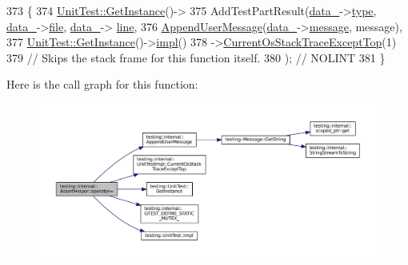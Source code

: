 \begin{DoxyCode}
373                                                          \{
374   \hyperlink{classtesting_1_1UnitTest_a24192400b70b3b946746954e9574fb8e}{UnitTest::GetInstance}()->
375     AddTestPartResult(\hyperlink{classtesting_1_1internal_1_1AssertHelper_af69a4d66a929d0c6e419f4efd3ba6b3a}{data\_}->\hyperlink{structtesting_1_1internal_1_1AssertHelper_1_1AssertHelperData_a7b1d1a77882cd82107acea856d45692f}{type}, \hyperlink{classtesting_1_1internal_1_1AssertHelper_af69a4d66a929d0c6e419f4efd3ba6b3a}{data\_}->\hyperlink{structtesting_1_1internal_1_1AssertHelper_1_1AssertHelperData_a639ae4acc706e919b101786f71e9dc15}{file}, \hyperlink{classtesting_1_1internal_1_1AssertHelper_af69a4d66a929d0c6e419f4efd3ba6b3a}{data\_}->
      \hyperlink{structtesting_1_1internal_1_1AssertHelper_1_1AssertHelperData_aff816673320ecd035288dffe44760f90}{line},
376                       \hyperlink{namespacetesting_1_1internal_ae475a090bca903bb222dd389eb189166}{AppendUserMessage}(\hyperlink{classtesting_1_1internal_1_1AssertHelper_af69a4d66a929d0c6e419f4efd3ba6b3a}{data\_}->\hyperlink{structtesting_1_1internal_1_1AssertHelper_1_1AssertHelperData_ae81536d57b8deb5dca4159cc6f7efdf0}{message}, message),
377                       \hyperlink{classtesting_1_1UnitTest_a24192400b70b3b946746954e9574fb8e}{UnitTest::GetInstance}()->\hyperlink{classtesting_1_1UnitTest_a4df5d11a58affb337d7fa62eaa07690e}{impl}()
378                       ->\hyperlink{classtesting_1_1internal_1_1UnitTestImpl_a61c0a51ac4e57d9f884f646ca6dd2210}{CurrentOsStackTraceExceptTop}(1)
379                       \textcolor{comment}{// Skips the stack frame for this function itself.}
380                       );  \textcolor{comment}{// NOLINT}
381 \}
\end{DoxyCode}
Here is the call graph for this function\+:
\nopagebreak
\begin{figure}[H]
\begin{center}
\leavevmode
\includegraphics[width=350pt]{classtesting_1_1internal_1_1AssertHelper_a97bf22d786131ab7baa86b97a27aeb4d_cgraph}
\end{center}
\end{figure}


